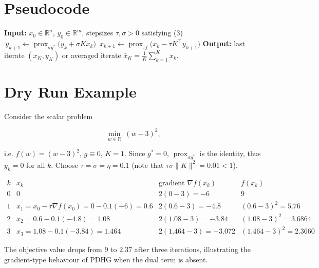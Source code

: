 \documentclass{article}
\begin{document}
\section*{Pseudocode}
\begin{algorithm}[H]
\caption{Primal–Dual Hybrid Gradient (PDHG)}
\begin{algorithmic}[1]
\STATE \textbf{Input:} $x_{0}\in\mathbb R^{n}$, $y_{0}\in\mathbb R^{m}$, stepsizes $\tau,\sigma>0$ satisfying (3)
    \STATE $\,\displaystyle y_{k+1}\gets \operatorname{prox}_{\sigma g^{*}}\!\bigl(y_{k}+ \sigma K x_{k}\bigr)$
    \STATE $\,\displaystyle x_{k+1}\gets \operatorname{prox}_{\tau f}\!\bigl(x_{k}-\tau K^{\top} y_{k+1}\bigr)$
\ENDFOR
\STATE \textbf{Output:} last iterate $(x_{K},y_{K})$ or averaged iterate $\bar x_{K}=\frac1K\sum_{k=1}^{K}x_{k}$.
\end{algorithmic}
\end{algorithm}

\section*{Dry Run Example}
Consider the scalar problem  

\[
\min_{w\in\mathbb R}\;(w-3)^{2},
\]

i.e. $f(w)=(w-3)^{2}$, $g\equiv0$, $K=1$.  
Since $g^{*}=0$, $\operatorname{prox}_{\sigma g^{*}}$ is the identity, thus $y_{k}=0$ for all $k$.  
Choose $\tau=\sigma=\eta=0.1$ (note that $\tau\sigma\|K\|^{2}=0.01<1$).

\[
\begin{array}{c|c|c|c}
k & x_{k} & \text{gradient } \nabla f(x_{k}) & f(x_{k})\\ \hline
0 & 0 & 2(0-3)=-6 & 9\\
1 & x_{1}=x_{0}-\tau\nabla f(x_{0})=0-0.1(-6)=0.6 & 2(0.6-3)=-4.8 & (0.6-3)^{2}=5.76\\
2 & x_{2}=0.6-0.1(-4.8)=1.08 & 2(1.08-3)=-3.84 & (1.08-3)^{2}=3.6864\\
3 & x_{3}=1.08-0.1(-3.84)=1.464 & 2(1.464-3)=-3.072 & (1.464-3)^{2}=2.3660
\end{array}
\]

The objective value drops from $9$ to $2.37$ after three iterations, illustrating the gradient‑type behaviour of PDHG when the dual term is absent.

\newpage
\end{document}
